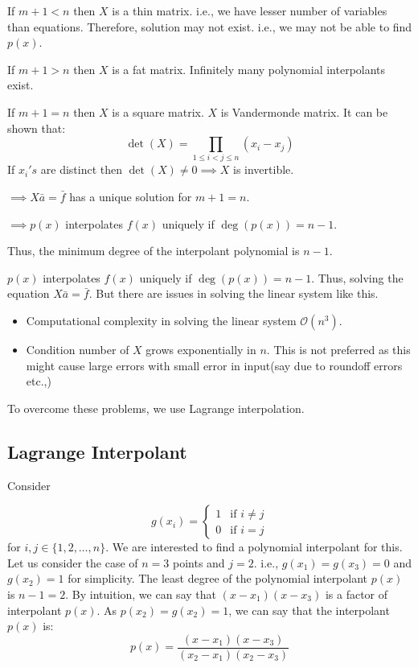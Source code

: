 \documentclass[
]{book}
\providecommand{\tightlist}{%
  \setlength{\itemsep}{0pt}\setlength{\parskip}{0pt}}
\begin{document}
If \(m+1<n\) then \(X\) is a thin matrix. i.e., we have lesser number of variables than equations. Therefore, solution may not exist. i.e., we may not be able to find \(p(x)\).

If \(m+1>n\) then \(X\) is a fat matrix. Infinitely many polynomial interpolants exist.

If \(m+1=n\) then \(X\) is a square matrix. \(X\) is Vandermonde matrix. It can be shown that:
\[\det(X) = \prod_{1\le i<j\le n}(x_i-x_j)\]
If \(x_i's\) are distinct then \(\det(X)\neq 0 \implies X\) is invertible.

\(\implies X\bar{a} = \bar{f}\) has a unique solution for \(m+1=n\).

\(\implies p(x)\) interpolates \(f(x)\) uniquely if \(\deg(p(x)) = n-1\).

Thus, the minimum degree of the interpolant polynomial is \(n-1\).

\(p(x)\) interpolates \(f(x)\) uniquely if \(\deg(p(x))=n-1\). Thus, solving the equation \(X\bar{a} = \bar{f}\).
But there are issues in solving the linear system like this.

\begin{itemize}
\tightlist
\item
  Computational complexity in solving the linear system \(\mathcal{O}(n^3)\).
\item
  Condition number of \(X\) grows exponentially in \(n\). This is not preferred as this might cause large errors with small error in input(say due to roundoff errors etc.,)
\end{itemize}

To overcome these problems, we use Lagrange interpolation.

\hypertarget{lagrange-interpolant}{%
\subsection{Lagrange Interpolant}\label{lagrange-interpolant}}

Consider

\begin{equation}
g(x_i) = \begin{cases}
        1 & \text{if } i\neq j\\
        0 & \text{if } i=j
    \end{cases}
\end{equation}
for \(i,j \in \{1,2,\dots,n\}\). We are interested to find a polynomial interpolant for this. Let us consider the case of \(n=3\) points and \(j=2\). i.e., \(g(x_1)=g(x_3)=0\) and \(g(x_2)=1\) for simplicity. The least degree of the polynomial interpolant \(p(x)\) is \(n-1=2\). By intuition, we can say that \((x-x_1)(x-x_3)\) is a factor of interpolant \(p(x)\). As \(p(x_2)=g(x_2)=1\), we can say that the interpolant \(p(x)\) is:
\begin{equation}
p(x) = \frac{(x-x_1)(x-x_3)}{(x_2-x_1)(x_2-x_3)}
\end{equation}
\end{document}
